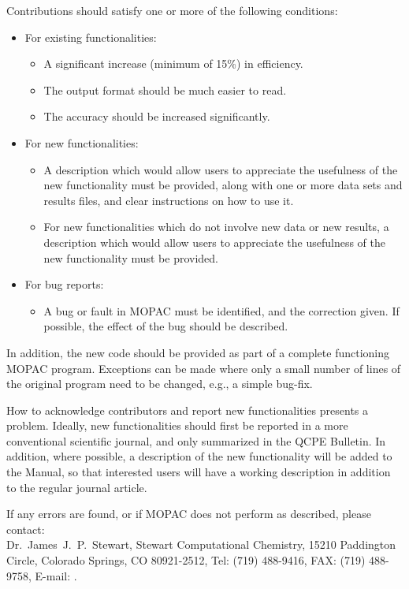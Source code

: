 Contributions should satisfy one or more
of the following conditions: 
\begin{itemize}
\item For existing functionalities:
\begin{itemize}
\item A significant increase (minimum of 15\%) in efficiency.
\item The output format should be much easier to read.
\item The accuracy should be increased significantly.
\end{itemize}
\item For new functionalities:
\begin{itemize}
\item A description which would allow users to appreciate the usefulness
of the new functionality must be provided, along with one or more data sets
and results files, and clear instructions on how to use it.
\item For new functionalities which do not involve new data or new results,
a description which would allow users to appreciate the usefulness
of the new functionality must be provided.
\end{itemize}
\item For bug reports:
\begin{itemize}
\item A bug or fault in MOPAC must be identified, and the correction given.
If possible, the effect of the bug should be described.
\end{itemize}
\end{itemize}

In addition, the new code should be provided as part of a complete functioning
MOPAC program.  Exceptions can be made where only a small number of lines of
the original program need to be changed, e.g., a simple bug-fix.

How to acknowledge contributors and report new functionalities presents a
problem. Ideally, new functionalities should first be reported in a more
conventional scientific journal, and only summarized in the QCPE Bulletin.  In
addition, where possible, a description of the new functionality will be added
to the Manual, so that interested users will have a working description in
addition to the regular journal article.

If any errors are found, or if MOPAC does not perform  as   described,   please   contact:   \\
Dr.~James~J.~P.~Stewart,
Stewart Computational Chemistry, 15210 Paddington Circle, Colorado Springs,
CO 80921-2512, Tel: (719) 488-9416, FAX: (719) 488-9758,
E-mail:
.

